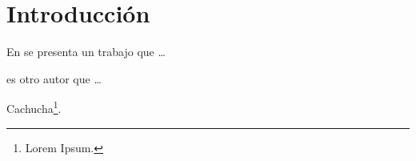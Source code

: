 \chapter*{Introducción}
\label{intro}

\blindtext

\blindtext

En \textcite{parsing-mixfix-operators} se presenta un trabajo que \ldots

\citeauthor{parsing-mixfix-operators} es otro autor que \ldots

\blindtext

\blinditemize

Cachucha\footnote{Lorem Ipsum.}.

\blindtext[4]

